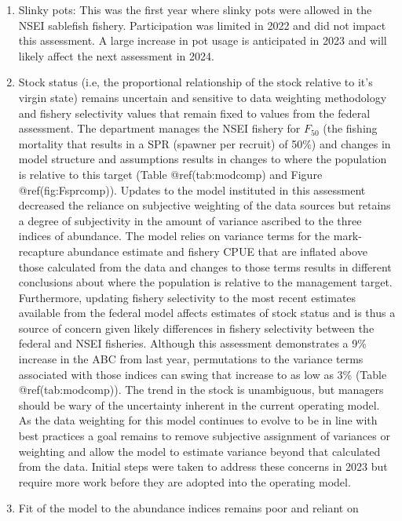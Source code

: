 \documentclass[
]{article}
\begin{document}
\begin{enumerate}
\def\labelenumi{\arabic{enumi}.}
\item
  {Slinky pots:} This was the first year where slinky pots were allowed
  in the NSEI sablefish fishery. Participation was limited in 2022 and
  did not impact this assessment. A large increase in pot usage is
  anticipated in 2023 and will likely affect the next assessment in
  2024.
\item
  Stock status (i.e, the proportional relationship of the stock relative
  to it's virgin state) remains uncertain and sensitive to data
  weighting methodology and fishery selectivity values that remain fixed
  to values from the federal assessment. The department manages the NSEI
  fishery for \(F_{50}\) (the fishing mortality that results in a SPR
  (spawner per recruit) of 50\%) and changes in model structure and
  assumptions results in changes to where the population is relative to
  this target (Table @ref(tab:modcomp) and Figure @ref(fig:Fsprcomp)).
  Updates to the model instituted in this assessment decreased the
  reliance on subjective weighting of the data sources but retains a
  degree of subjectivity in the amount of variance ascribed to the three
  indices of abundance. The model relies on variance terms for the
  mark-recapture abundance estimate and fishery CPUE that are inflated
  above those calculated from the data and changes to those terms
  results in different conclusions about where the population is
  relative to the management target. Furthermore, updating fishery
  selectivity to the most recent estimates available from the federal
  model affects estimates of stock status and is thus a source of
  concern given likely differences in fishery selectivity between the
  federal and NSEI fisheries. Although this assessment demonstrates a
  9\% increase in the ABC from last year, permutations to the variance
  terms associated with those indices can swing that increase to as low
  as 3\% (Table @ref(tab:modcomp)). The trend in the stock is
  unambiguous, but managers should be wary of the uncertainty inherent
  in the current operating model. As the data weighting for this model
  continues to evolve to be in line with best practices a goal remains
  to remove subjective assignment of variances or weighting and allow
  the model to estimate variance beyond that calculated from the data.
  Initial steps were taken to address these concerns in 2023 but require
  more work before they are adopted into the operating model.
\item
  Fit of the model to the abundance indices remains poor and reliant on

\end{enumerate}
\end{document}
